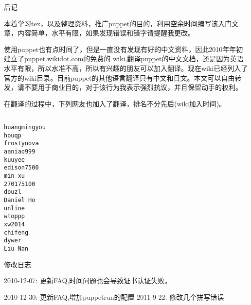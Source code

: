 
\newpage
\begin{center}
\msyh
后记
\end{center}
\fsong
\par
本着学习tex，以及整理资料，推广puppet的目的，利用空余时间编写该入门文章，内容简单，水平有限，如果发现错误和错字请提醒我更改。\par
使用puppet也有点时间了，但是一直没有发现有好的中文资料，因此2010年年初建立了puppet.wikidot.com的免费的 wiki,翻译puppet的中文文档，还是因为英语水平有限，所以水准不高，所以有兴趣的朋友可以加入翻译。现在wiki已经列入了官方的wiki目录。目前puppet的其他语言翻译只有中文和日文。本文可以自由转发，请不要用于商业目的，对于该行为我表示强烈抗议，并且保留动手的权利。\par
在翻译的过程中，下列网友也加入了翻译，排名不分先后(wiki加入时间)。\par

\msyh \begin{lstlisting}

huangmingyou	
houqp	
frostynova	
aaniao999	
kuuyee	
edison7500	
min xu	
270175100	
douzl	
Daniel Ho	
unline	
wtoppp	
xw2014	
chifeng	
dywer	
Liu Nan	
\end{lstlisting} \song

\newpage
\begin{center}
\msyh
修改日志
\end{center}
\fsong


2010-12-07:	更新FAQ,时间问题也会导致证书认证失败。\par
2010-12-30:	更新FAQ,增加puppetrun的配置
2011-9-22:	修改几个拼写错误
